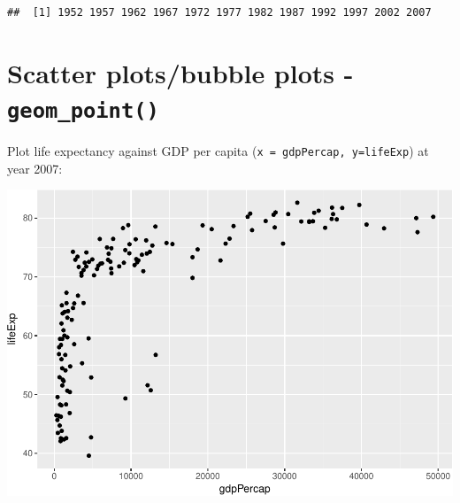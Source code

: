 \documentclass[12pt,]{krantz}
\makeatletter
\newenvironment{Shaded}{\begin{snugshade}}{\end{snugshade}}
\newcommand{\DataTypeTok}[1]{\textcolor[rgb]{0.13,0.29,0.53}{#1}}
\newcommand{\DecValTok}[1]{\textcolor[rgb]{0.00,0.00,0.81}{#1}}
\newcommand{\KeywordTok}[1]{\textcolor[rgb]{0.13,0.29,0.53}{\textbf{#1}}}
\newcommand{\NormalTok}[1]{#1}
\newcommand{\OperatorTok}[1]{\textcolor[rgb]{0.81,0.36,0.00}{\textbf{#1}}}
\newcommand{\StringTok}[1]{\textcolor[rgb]{0.31,0.60,0.02}{#1}}
\newenvironment{kframe}{%
\medskip{}
\setlength{\fboxsep}{.8em}
 \def\at@end@of@kframe{}%
 \ifinner\ifhmode%
  \def\at@end@of@kframe{\end{minipage}}%
  \begin{minipage}{\columnwidth}%
 \fi\fi%
 \def\FrameCommand##1{\hskip\@totalleftmargin \hskip-\fboxsep
 \colorbox{shadecolor}{##1}\hskip-\fboxsep
     \hskip-\linewidth \hskip-\@totalleftmargin \hskip\columnwidth}%
 \MakeFramed {\advance\hsize-\width
   \@totalleftmargin\z@ \linewidth\hsize
   \@setminipage}}%
 {\par\unskip\endMakeFramed%
 \at@end@of@kframe}
\renewenvironment{Shaded}{\begin{kframe}}{\end{kframe}}
\theoremstyle{definition}
\theoremstyle{definition}
\theoremstyle{definition}
\theoremstyle{remark}
\makeatother
\begin{document}
\begin{Shaded}
\end{Shaded}

\begin{verbatim}
##  [1] 1952 1957 1962 1967 1972 1977 1982 1987 1992 1997 2002 2007
\end{verbatim}

\hypertarget{scatter-plotsbubble-plots---geom_point}{%
\section{\texorpdfstring{Scatter plots/bubble plots -
\texttt{geom\_point()}}{Scatter plots/bubble plots - geom\_point()}}\label{scatter-plotsbubble-plots---geom_point}}

Plot life expectancy against GDP per capita
(\texttt{x\ =\ gdpPercap,\ y=lifeExp}) at year 2007:

\begin{Shaded}
\end{Shaded}

\includegraphics{04_plotting_files/figure-latex/unnamed-chunk-2-1.pdf}
\end{document}
